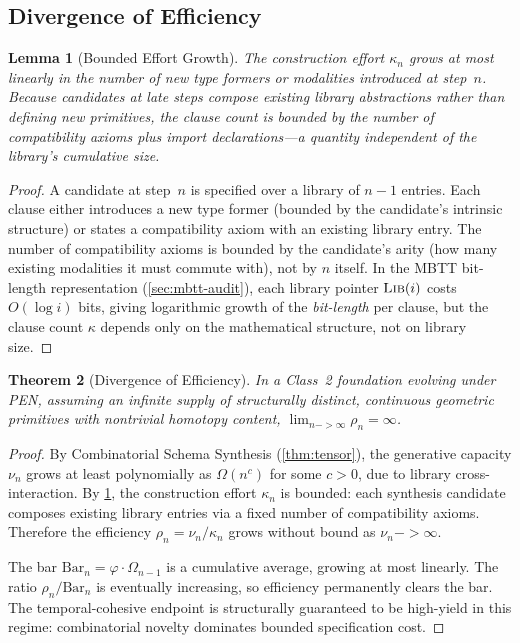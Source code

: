 \documentclass[11pt,a4paper]{article}
\def\to{->}%
\theoremstyle{plain}
\newtheorem{theorem}{Theorem}[section]
\newtheorem{lemma}[theorem]{Lemma}
\theoremstyle{definition}
\theoremstyle{remark}
\begin{document}
\subsection{Divergence of Efficiency}

\begin{lemma}[Bounded Effort Growth]
\label{lem:log-effort}
The construction effort $\kappa_n$ grows at most linearly in the number of new type formers or modalities introduced at step~$n$.
Because candidates at late steps compose existing library abstractions rather than defining new primitives, the clause count is bounded by the number of compatibility axioms plus import declarations---a quantity independent of the library's cumulative size.
\end{lemma}

\begin{proof}
A candidate at step~$n$ is specified over a library of $n - 1$ entries.
Each clause either introduces a new type former (bounded by the candidate's intrinsic structure) or states a compatibility axiom with an existing library entry.
The number of compatibility axioms is bounded by the candidate's arity (how many existing modalities it must commute with), not by $n$ itself.
In the MBTT bit-length representation (\cref{sec:mbtt-audit}), each library pointer $\textsc{Lib}(i)$ costs $O(\log i)$ bits, giving logarithmic growth of the \emph{bit-length} per clause, but the clause count $\kappa$ depends only on the mathematical structure, not on library size.
\end{proof}

\begin{theorem}[Divergence of Efficiency]
\label{thm:divergence}
In a Class~2 foundation evolving under PEN, assuming an infinite supply of structurally distinct, continuous geometric primitives with nontrivial homotopy content, $\lim_{n \to \infty} \rho_n = \infty$.
\end{theorem}

\begin{proof}
By Combinatorial Schema Synthesis (\cref{thm:tensor}), the generative capacity $\nu_n$ grows at least polynomially as $\Omega(n^c)$ for some $c > 0$, due to library cross-interaction.
By \cref{lem:log-effort}, the construction effort $\kappa_n$ is bounded: each synthesis candidate composes existing library entries via a fixed number of compatibility axioms.
Therefore the efficiency $\rho_n = \nu_n / \kappa_n$ grows without bound as $\nu_n \to \infty$.

The bar $\mathrm{Bar}_n = \varphi \cdot \Omega_{n-1}$ is a cumulative average, growing at most linearly.
The ratio $\rho_n / \mathrm{Bar}_n$ is eventually increasing, so efficiency permanently clears the bar.
The temporal-cohesive endpoint is structurally guaranteed to be high-yield in this regime: combinatorial novelty dominates bounded specification cost.
\end{proof}
\end{document}
